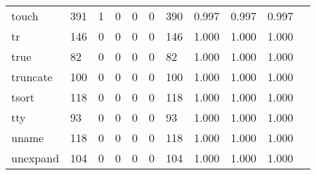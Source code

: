 \begin{longtable}{lp{1.10cm}p{1.10cm}p{1.10cm}p{1.10cm}p{1.10cm}p{1.10cm}p{1.10cm}p{1.10cm}p{1.10cm}p{1.10cm}}
touch     &                    391 &                                  1 &                                 0 &                                0 &                                 0 &                             390 &                          0.997 &                                 0.997 &                               0.997 \\
tr        &                    146 &                                  0 &                                 0 &                                0 &                                 0 &                             146 &                          1.000 &                                 1.000 &                               1.000 \\
true      &                     82 &                                  0 &                                 0 &                                0 &                                 0 &                              82 &                          1.000 &                                 1.000 &                               1.000 \\
truncate  &                    100 &                                  0 &                                 0 &                                0 &                                 0 &                             100 &                          1.000 &                                 1.000 &                               1.000 \\
tsort     &                    118 &                                  0 &                                 0 &                                0 &                                 0 &                             118 &                          1.000 &                                 1.000 &                               1.000 \\
tty       &                     93 &                                  0 &                                 0 &                                0 &                                 0 &                              93 &                          1.000 &                                 1.000 &                               1.000 \\
uname     &                    118 &                                  0 &                                 0 &                                0 &                                 0 &                             118 &                          1.000 &                                 1.000 &                               1.000 \\
unexpand  &                    104 &                                  0 &                                 0 &                                0 &                                 0 &                             104 &                          1.000 &                                 1.000 &                               1.000 \\

\end{longtable}
